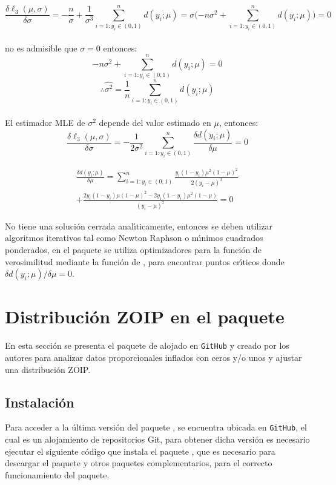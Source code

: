 \begin{enumerate}
\[
\frac{\delta \ell_3(\mu,\sigma)}{\delta \sigma}=-\frac{n}{\sigma}+\frac{1}{\sigma^3}\sum_{i=1:y_i \in (0,1)}^{n}{d(y_i;\mu)}=\sigma(-n\sigma^2+\sum_{i=1:y_i \in (0,1)}^{n}{d(y_i;\mu))}=0
\]
\\
no es admisible que $\sigma=0$ entonces:
\[
-n\sigma^2+\sum_{i=1:y_i \in (0,1)}^{n}{d(y_i;\mu)}=0
\]
\[
\therefore \hat{\sigma^2}=\frac{1}{n}\sum_{i=1:y_i \in (0,1)}^{n}{d(y_i;\mu)}
\]
\\
El estimador MLE de $\sigma^2$ depende del valor estimado en $\mu$, entonces:
\[
\frac{\delta \ell_3(\mu,\sigma)}{\delta \sigma}=-\frac{1}{2\sigma^2}\sum_{i=1:y_i \in (0,1)}^{n}{\frac{\delta d(y_i;\mu)}{\delta\mu}}=0
\]

\begin{multline*}
\frac{\delta d(y_i;\mu)}{\delta\mu}=\sum_{i=1:y_i \in (0,1)}^{n}\frac{y_i(1-y_i)\mu^2(1-\mu)^2}{2(y_i-\mu)^3}\\
+\frac{2y_i(1-y_i)\mu(1-\mu)^2-2y_i(1-y_i)\mu^2(1-\mu)}{(y_i-\mu)^2}=0
\end{multline*}

No tiene una soluci\'{o}n cerrada anal\'{\i}ticamente, entonces se deben utilizar algoritmos iterativos tal como Newton Raphson o m\'{\i}nimos cuadrados ponderados, en el paquete  se utiliza optimizadores para la funci\'{o}n de verosimilitud mediante la funci\'{o}n  de , para encontrar puntos cr\'{\i}ticos donde ${\delta d(y_i;\mu)}/{\delta\mu}=0$.

\end{enumerate}



\section{Distribuci\'{o}n ZOIP en el paquete }

En esta secci\'{o}n se presenta el paquete  de  alojado en \verb|GitHub| y creado por los autores para analizar datos proporcionales inflados con ceros y/o unos y ajustar una distribuci\'{o}n ZOIP.

\subsection{Instalaci\'{o}n}

Para acceder a la \'{u}ltima versi\'{o}n del paquete , se encuentra ubicada en \verb|GitHub|, el cual es un alojamiento de repositorios Git, para obtener dicha versi\'{o}n es necesario ejecutar el siguiente c\'{o}digo que instala el paquete , que es necesario para descargar el paquete  y otros paquetes complementarios, para el correcto funcionamiento del paquete.

